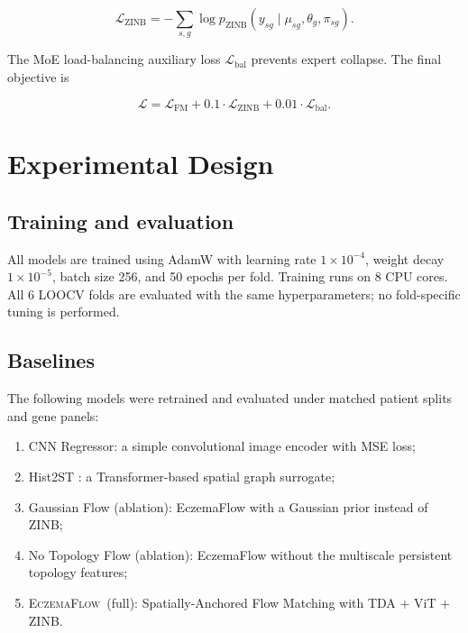 \documentclass[nocrop]{bioinfo}
\newcommand{\softwarename}{\textsc{EczemaFlow}}
\begin{document}
\begin{equation}
\mathcal{L}_{\mathrm{ZINB}}=
-\sum_{s,g}
\log p_{\mathrm{ZINB}}
\left(y_{sg}\mid\mu_{sg},\theta_g,\pi_{sg}\right).
\end{equation}

The MoE load-balancing auxiliary loss $\mathcal{L}_{\mathrm{bal}}$ prevents expert collapse. The final objective is

\begin{equation}
\mathcal{L}=
\mathcal{L}_{\mathrm{FM}}
+ 0.1 \cdot \mathcal{L}_{\mathrm{ZINB}}
+ 0.01 \cdot \mathcal{L}_{\mathrm{bal}}.
\end{equation}

\section{Experimental Design}

\subsection{Training and evaluation}

All models are trained using AdamW \citep{loshchilov2019adamw} with learning rate $1 \times 10^{-4}$, weight decay $1 \times 10^{-5}$, batch size 256, and 50 epochs per fold. Training runs on 8 CPU cores. All 6 LOOCV folds are evaluated with the same hyperparameters; no fold-specific tuning is performed.

\subsection{Baselines}

The following models were retrained and evaluated under matched patient splits and gene panels:

\begin{enumerate}
\item CNN Regressor: a simple convolutional image encoder with MSE loss;
\item Hist2ST \citep{zeng2022hist2st}: a Transformer-based spatial graph surrogate;
\item Gaussian Flow (ablation): EczemaFlow with a Gaussian prior instead of ZINB;
\item No Topology Flow (ablation): EczemaFlow without the multiscale persistent topology features;
\item \softwarename~(full): Spatially-Anchored Flow Matching with TDA + ViT + ZINB.
\end{enumerate}
\end{document}
